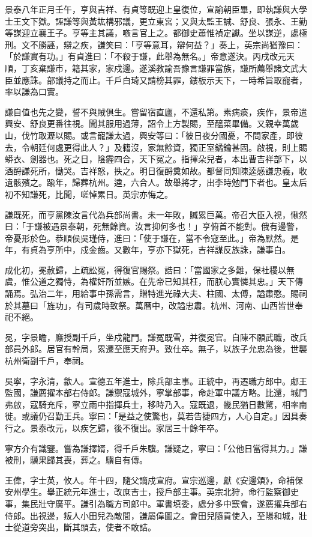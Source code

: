 \begin{pinyinscope}
景泰八年正月壬午，亨與吉祥、有貞等既迎上皇復位，宣諭朝臣畢，即執謙與大學士王文下獄。誣謙等與黃竑構邪議，更立東宮；又與太監王誠、舒良、張永、王勤等謀迎立襄王子。亨等主其議，嗾言官上之。都御史蕭惟禎定讞。坐以謀逆，處極刑。文不勝誣，辯之疾，謙笑曰：「亨等意耳，辯何益？」奏上，英宗尚猶豫曰：「於謙實有功。」有貞進曰：「不殺于謙，此舉為無名。」帝意遂決。丙戌改元天順，丁亥棄謙市，籍其家，家戍邊。遂溪教諭吾豫言謙罪當族，謙所薦舉諸文武大臣並應誅。部議持之而止。千戶白琦又請榜其罪，鏤板示天下，一時希旨取寵者，率以謙為口實。

謙自值也先之變，誓不與賊俱生。嘗留宿直廬，不還私第。素病痰，疾作，景帝遣興安、舒良更番往視。聞其服用過薄，詔令上方製賜，至醯菜畢備。又親幸萬歲山，伐竹取瀝以賜。或言寵謙太過，興安等曰：「彼日夜分國憂，不問家產，即彼去，令朝廷何處更得此人？」及籍沒，家無餘資，獨正室鐍鑰甚固。啟視，則上賜蟒衣、劍器也。死之日，陰霾四合，天下冤之。指揮朵兒者，本出曹吉祥部下，以酒酹謙死所，慟哭。吉祥怒，抶之。明日復酹奠如故。都督同知陳逵感謙忠義，收遺骸殯之。踰年，歸葬杭州。逵，六合人。故舉將才，出李時勉門下者也。皇太后初不知謙死，比聞，嗟悼累日。英宗亦悔之。

謙既死，而亨黨陳汝言代為兵部尚書。未一年敗，贓累巨萬。帝召大臣入視，愀然曰：「于謙被遇景泰朝，死無餘資。汝言抑何多也！」亨俯首不能對。俄有邊警，帝憂形於色。恭順侯吳瑾侍，進曰：「使于謙在，當不令寇至此。」帝為默然。是年，有貞為亨所中，戍金齒。又數年，亨亦下獄死，吉祥謀反族誅，謙事白。

成化初，冕赦歸，上疏訟冤，得復官賜祭。誥曰：「當國家之多難，保社稷以無虞，惟公道之獨恃，為權奸所並嫉。在先帝已知其枉，而朕心實憐其忠。」天下傳誦焉。弘治二年，用給事中孫需言，贈特進光祿大夫、柱國、太傅，謚肅愍。賜祠於其墓曰「旌功」，有司歲時致祭。萬曆中，改謚忠肅。杭州、河南、山西皆世奉祀不絕。

冕，字景瞻，廕授副千戶，坐戍龍門。謙冤既雪，并復冕官。自陳不願武職，改兵部員外郎。居官有幹局，累遷至應天府尹。致仕卒。無子，以族子允忠為後，世襲杭州衛副千戶，奉祠。

吳寧，字永清，歙人。宣德五年進士，除兵部主事。正統中，再遷職方郎中。郕王監國，謙薦擢本部右侍郎。謙禦寇城外，寧掌部事，命赴軍中議方略。比還，城門弗啟，寇騎充斥，寧立雨中指揮兵士，移時乃入。寇既退，畿民猶日數驚，相率南徙。或議仍召勤王兵。寧曰：「是益之使驚也，莫若告捷四方，人心自定。」因具奏行之。景泰改元，以疾乞歸，後不復出。家居三十餘年卒。

寧方介有識鑒。嘗為謙擇婿，得千戶朱驥。謙疑之，寧曰：「公他日當得其力。」謙被刑，驥果歸其喪，葬之。驥自有傳。

王偉，字士英，攸人。年十四，隨父謫戍宣府。宣宗巡邊，獻《安邊頌》，命補保安州學生。舉正統元年進士，改庶吉士，授戶部主事。英宗北狩，命行監察御史事，集民壯守廣平。謙引為職方司郎中。軍書填委，處分多中窾會，遂薦擢兵部右侍郎。出視邊，叛人小田兒為敵間，謙屬偉圖之。會田兒隨貢使入，至陽和城，壯士從道旁突出，斷其頭去，使者不敢詰。


\end{pinyinscope}
